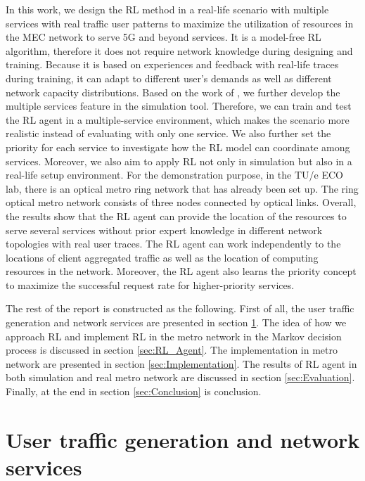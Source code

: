 \documentclass[conference]{IEEEtran}
\begin{document}
In this work, we design the RL method in a real-life scenario with multiple services with real traffic user patterns to maximize the utilization of resources in the MEC network to serve 5G and beyond services. It is a model-free RL algorithm, therefore it does not require network knowledge during designing and training. Because it is based on experiences and feedback with real-life traces during training, it can adapt to different user's demands as well as different network capacity distributions. Based on the work of \cite{9269087}, we further develop the multiple services feature in the simulation tool. Therefore, we can train and test the RL agent in a multiple-service environment, which makes the scenario more realistic instead of evaluating with only one service. We also further set the priority for each service to investigate how the RL model can coordinate among services. Moreover, we also aim to apply RL not only in simulation but also in a real-life setup environment. For the demonstration purpose, in the TU/e ECO lab, there is an optical metro ring network that has already been set up. The ring optical metro network consists of three nodes connected by optical links. Overall, the results show that the RL agent can provide the location of the resources to serve several services without prior expert knowledge in different network topologies with real user traces. The RL agent can work independently to the locations of client aggregated traffic as well as the location of computing resources in the network. Moreover, the RL agent also learns the priority concept to maximize the successful request rate for higher-priority services. 

The rest of the report is constructed as the following. First of all, the user traffic generation and network services are presented in section \ref{sec:User traffic generation}. The idea of how we approach RL and implement RL in the metro network in the Markov decision process is discussed in section \ref{sec:RL_Agent}. The implementation in metro network are presented in section \ref{sec:Implementation}. The results of RL agent in both simulation and real metro network are discussed in section \ref{sec:Evaluation}. Finally, at the end in section \ref{sec:Conclusion} is conclusion.


\section{User traffic generation and network services}
\label{sec:User traffic generation}
\end{document}
